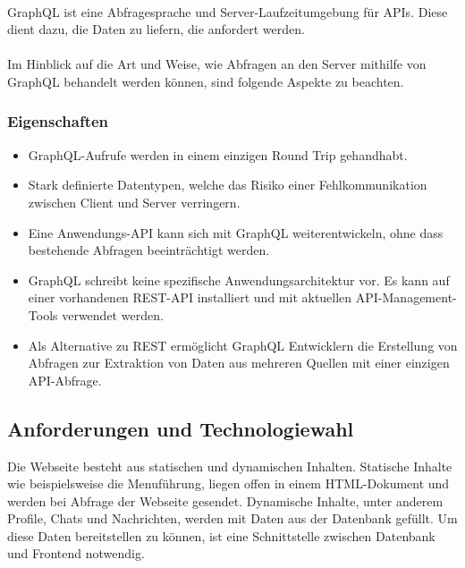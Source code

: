 \paragraph{}
GraphQL ist eine Abfragesprache und Server-Laufzeitumgebung für APIs. Diese dient dazu, die Daten zu liefern, die anfordert werden.
\\\\
Im Hinblick auf die Art und Weise, wie Abfragen an den Server mithilfe von GraphQL behandelt werden können, sind folgende Aspekte zu beachten.
\subsubsection*{Eigenschaften}
  \begin{itemize}
    \item
          GraphQL-Aufrufe werden in einem einzigen Round Trip gehandhabt.%

    \item
          Stark definierte Datentypen, welche das Risiko einer Fehlkommunikation zwischen Client und Server verringern.

    \item
          Eine Anwendungs-API kann sich mit GraphQL weiterentwickeln, ohne dass bestehende Abfragen beeinträchtigt werden.
    \item
          GraphQL schreibt keine spezifische Anwendungsarchitektur vor. Es kann auf einer vorhandenen REST-API installiert und mit aktuellen API-Management-Tools verwendet werden.
    \item
          Als Alternative zu REST ermöglicht GraphQL Entwicklern die Erstellung von Abfragen zur Extraktion von Daten aus mehreren Quellen mit einer einzigen API-Abfrage.

  \end{itemize}
  
  \subsection{Anforderungen und Technologiewahl}
Die Webseite besteht aus statischen und dynamischen Inhalten.
Statische Inhalte wie beispielsweise die Menuführung, liegen offen in einem HTML-Dokument und werden bei Abfrage der Webseite gesendet. 
Dynamische Inhalte, unter anderem Profile, Chats und Nachrichten, werden mit Daten aus der Datenbank gefüllt.
Um diese Daten bereitstellen zu können, ist eine Schnittstelle zwischen Datenbank und Frontend notwendig. 


